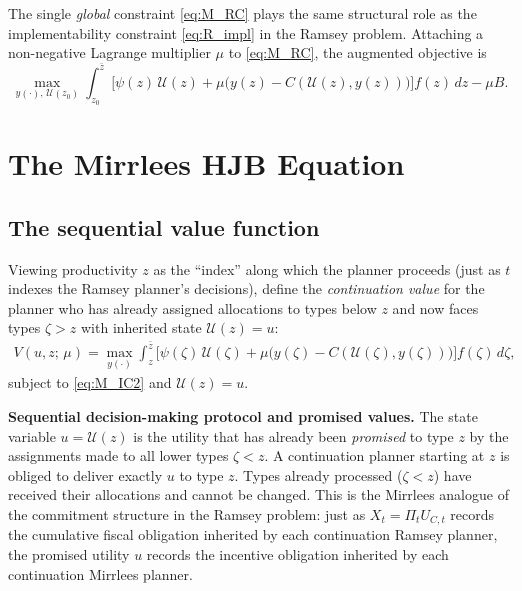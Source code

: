 \documentclass[12pt]{article}
\newcommand{\calU}{\mathcal{U}}
\newcommand{\zbar}{\bar{z}}
\newcommand{\zlow}{z_{0}}
\begin{document}
The single \emph{global} constraint \eqref{eq:M_RC} plays the same structural
role as the implementability constraint \eqref{eq:R_impl} in the Ramsey
problem.  Attaching a non-negative Lagrange multiplier $\mu$ to \eqref{eq:M_RC},
the augmented objective is
\begin{equation}\label{eq:M_augmented}
  \max_{y(\cdot),\, \calU(\zlow)}
  \int_{\zlow}^{\zbar}
  \bigl[\psi(z)\,\calU(z) + \mu\bigl(y(z) - C(\calU(z), y(z))\bigr)\bigr]
  f(z)\,dz - \mu B.
\end{equation}

\section{The Mirrlees HJB Equation}
\label{sec:mirrlees_hjb}

\subsection{The sequential value function}

Viewing productivity $z$ as the ``index'' along which the planner proceeds
(just as $t$ indexes the Ramsey planner's decisions), define the
\emph{continuation value} for the planner who has already assigned allocations
to types below $z$ and now faces types $\zeta > z$ with
inherited state $\calU(z) = u$:
\begin{align}
  V(u, z;\, \mu) = \max_{y(\cdot)}
  \int_z^{\zbar}
  \bigl[\psi(\zeta)\,\calU(\zeta) + \mu\bigl(y(\zeta) - C(\calU(\zeta), y(\zeta))\bigr)\bigr]
  f(\zeta)\,d\zeta,
  \label{eq:M_V}
\end{align}
subject to \eqref{eq:M_IC2} and $\calU(z) = u$.

\medskip\noindent\textbf{Sequential decision-making protocol and promised values.}
The state variable $u = \calU(z)$ is the utility that has already been
\emph{promised} to type $z$ by the assignments made to all lower types
$\zeta < z$.  A continuation planner starting at $z$ is obliged to
deliver exactly $u$ to type $z$.  Types already processed ($\zeta < z$) have
received their allocations and cannot be changed.  This is the Mirrlees analogue of the commitment structure in the Ramsey problem: just as $X_t = \Pi_t U_{C,t}$ records the cumulative fiscal obligation inherited by each continuation Ramsey planner, the promised utility $u$ records the incentive obligation inherited by each continuation Mirrlees planner.
\end{document}
